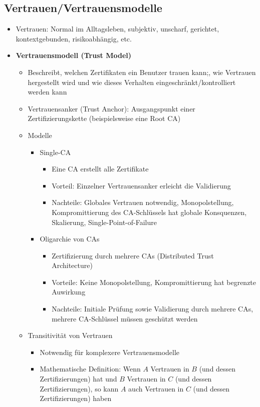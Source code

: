 \subsection{Vertrauen/Vertrauensmodelle}
\begin{itemize}
	\item Vertrauen: Normal im Alltagsleben, subjektiv, unscharf, gerichtet, kontextgebunden, risikoabhängig, etc.
	\item \textbf{Vertrauensmodell (Trust Model)}
	\begin{itemize}
		\item Beschreibt, welchen Zertifikaten ein Benutzer trauen kann;, wie Vertrauen hergestellt wird und wie dieses Verhalten eingeschränkt/kontrolliert werden kann
		\item Vertrauensanker (Trust Anchor): Ausgangspunkt einer Zertifizierungskette (beispielsweise eine Root CA)
		\item Modelle
		\begin{itemize}
			\item Single-CA
			\begin{itemize}
				\item Eine CA erstellt alle Zertifikate
				\item Vorteil: Einzelner Vertrauensanker erleicht die Validierung
				\item Nachteile: Globales Vertrauen notwendig, Monopolstellung, Kompromittierung des CA-Schlüssels hat globale Konsquenzen, Skalierung, Single-Point-of-Failure
			\end{itemize}
			\item Oligarchie von CAs
			\begin{itemize}
				\item Zertifizierung durch mehrere CAs (Distributed Trust Architecture)
				\item Vorteile: Keine Monopolstellung, Kompromittierung hat begrenzte Auwirkung
				\item Nachteile: Initiale Prüfung sowie Validierung durch mehrere CAs, mehrere CA-Schlüssel müssen geschützt werden
			\end{itemize}
		\end{itemize}
		\item Transitivität von Vertrauen
		\begin{itemize}
			\item Notwendig für komplexere Vertrauensmodelle
			\item Mathematische Definition: Wenn \(A\) Vertrauen in \(B\) (und dessen Zertifizierungen) hat und \(B\) Vertrauen in \(C\) (und dessen Zertifizierungen), so kann \(A\) auch Vertrauen in \(C\) (und dessen Zertifizierungen) haben

\end{itemize}
\end{itemize}
\end{itemize}
